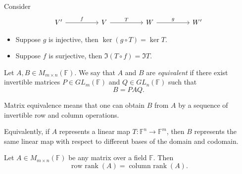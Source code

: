 \begin{lemma} \label{lm: inj/surj preserve ker im}
    Consider 
\[\begin{tikzcd}
	{V^{\prime}} && V && W && {W^{\prime}}
	\arrow["f", from=1-1, to=1-3]
	\arrow["T", from=1-3, to=1-5]
	\arrow["g", from=1-5, to=1-7]
\end{tikzcd}\]
\begin{itemize}
    \item Suppose \(g\) is injective, then \(\ker \left( g \circ T \right) = \ker T \).   
    \item Suppose \(f\) is surjective, then \(\Im (T \circ f) = \Im T\). 
\end{itemize}

\end{lemma}

\begin{definition}
Let $A, B \in M_{m \times n}(\mathbb{F})$. We say that $A$ and $B$ are 
\emph{equivalent} if there exist invertible matrices 
$P \in GL_m(\mathbb{F})$ and $Q \in GL_n(\mathbb{F})$ such that
\[
    B = P A Q.
\]
\end{definition}

\begin{remark}
Matrix equivalence means that one can obtain $B$ from $A$ by a sequence of
invertible row and column operations. 

Equivalently, if $A$ represents a linear map 
$T : \mathbb{F}^n \to \mathbb{F}^m$, then $B$ represents the same linear map 
with respect to different bases of the domain and codomain.
\end{remark}

\begin{theorem}
Let $A \in M_{m \times n}(\mathbb{F})$ be any matrix over a field $\mathbb{F}$. Then
\[
\operatorname{row\ rank}(A) = \operatorname{column\ rank}(A).
\]
\end{theorem}

